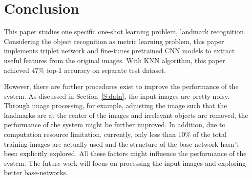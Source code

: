 \documentclass[final,3p]{elsarticle}
\begin{document}
\section{Conclusion}
\label{S:conclusion}

This paper studies one specific one-shot learning problem, landmark recognition. Considering the object recognition as metric learning problem, this paper implements triplet network and fine-tunes pretrained CNN models to extract useful features from the original images. With KNN algorithm, this paper achieved $47\%$ top-1 accuracy on separate test dataset.

However, there are further procedures exist to improve the performance of the system. As discussed in Section~\ref{S:data}, the input images are pretty noisy. Through image processing, for example, adjusting the image such that the landmarks are at the center of the images and irrelevant objects are removed, the performance of the system might be further improved. In addition, due to computation resource limitation, currently, only less than $10\%$ of the total training images are actually used and the structure of the base-network hasn't been explicitly explored. All these factors might influence the performance of the system. The future work will focus on processing the input images and exploring better base-networks.

%


\section{\refname}


\end{document}
